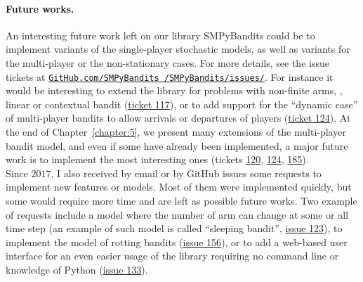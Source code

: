 \paragraph{Future works.}
%
An interesting future work left on our library SMPyBandits could be to implement variants of the single-player stochastic models, as well as variants for the multi-player or the non-stationary cases.
For more details, see the issue tickets at \href{https://github.com/SMPyBandits/SMPyBandits/issues/}{\texttt{GitHub.com/SMPyBandits /SMPyBandits/issues/}}.
For instance it would be interesting to extend the library for problems with non-finite arms, \eg, linear or contextual bandit (\href{https://github.com/SMPyBandits/SMPyBandits/issues/117}{ticket 117}),
or to add support for the ``dynamic case'' of multi-player bandits to allow arrivals or departures of players (\href{https://github.com/SMPyBandits/SMPyBandits/issues/124}{ticket 124}).
%
At the end of Chapter~\ref{chapter:5}, we present many extensions of the multi-player bandit model,
and even if some have already been implemented, a major future work is to implement the most interesting ones
(tickets \href{https://github.com/SMPyBandits/SMPyBandits/issues/120}{120}, \href{https://github.com/SMPyBandits/SMPyBandits/issues/124}{124}, \href{https://github.com/SMPyBandits/SMPyBandits/issues/185}{185}).\\
%
\indent
Since $2017$, I also received by email or by GitHub issues some requests to implement new features or models. Most of them were implemented quickly, but some would require more time and are left as possible future works.
Two example of requests include a model where the number of arm can change at some or all time step (an example of such model is called ``sleeping bandit'', \href{https://github.com/SMPyBandits/SMPyBandits/issues/123}{issue 123}), to implement the model of rotting bandits (\href{https://github.com/SMPyBandits/SMPyBandits/issues/156}{issue 156}), or to add a web-based user interface for an even easier usage of the library requiring no command line or knowledge of Python (\href{https://github.com/SMPyBandits/SMPyBandits/issues/133}{issue 133}).


